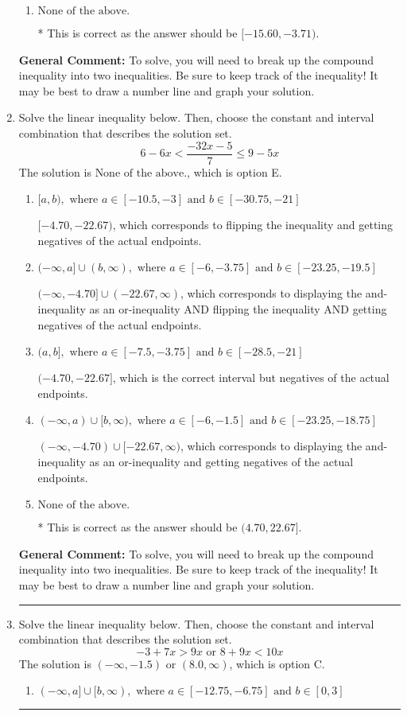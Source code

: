 \documentclass{extbook}[14pt]
\newcommand{\litem}[1]{\item #1

\rule{\textwidth}{0.4pt}}
\begin{document}
\begin{enumerate}
{\begin{enumerate}[label=\Alph*.]
$(-\infty, 15.60) \cup [3.71, \infty)$, which corresponds to displaying the and-inequality as an or-inequality AND flipping the inequality AND getting negatives of the actual endpoints.
\item \( \text{None of the above.} \)

* This is correct as the answer should be $[-15.60, -3.71)$.
\end{enumerate}

\textbf{General Comment:} To solve, you will need to break up the compound inequality into two inequalities. Be sure to keep track of the inequality! It may be best to draw a number line and graph your solution.
}
\litem{
Solve the linear inequality below. Then, choose the constant and interval combination that describes the solution set.
\[ 6 - 6 x < \frac{-32 x - 5}{7} \leq 9 - 5 x \]The solution is \( \text{None of the above.} \), which is option E.\begin{enumerate}[label=\Alph*.]
\item \( [a, b), \text{ where } a \in [-10.5, -3] \text{ and } b \in [-30.75, -21] \)

$[-4.70, -22.67)$, which corresponds to flipping the inequality and getting negatives of the actual endpoints.
\item \( (-\infty, a] \cup (b, \infty), \text{ where } a \in [-6, -3.75] \text{ and } b \in [-23.25, -19.5] \)

$(-\infty, -4.70] \cup (-22.67, \infty)$, which corresponds to displaying the and-inequality as an or-inequality AND flipping the inequality AND getting negatives of the actual endpoints.
\item \( (a, b], \text{ where } a \in [-7.5, -3.75] \text{ and } b \in [-28.5, -21] \)

$(-4.70, -22.67]$, which is the correct interval but negatives of the actual endpoints.
\item \( (-\infty, a) \cup [b, \infty), \text{ where } a \in [-6, -1.5] \text{ and } b \in [-23.25, -18.75] \)

$(-\infty, -4.70) \cup [-22.67, \infty)$, which corresponds to displaying the and-inequality as an or-inequality and getting negatives of the actual endpoints.
\item \( \text{None of the above.} \)

* This is correct as the answer should be $(4.70, 22.67]$.
\end{enumerate}

\textbf{General Comment:} To solve, you will need to break up the compound inequality into two inequalities. Be sure to keep track of the inequality! It may be best to draw a number line and graph your solution.
}
\litem{
Solve the linear inequality below. Then, choose the constant and interval combination that describes the solution set.
\[ -3 + 7 x > 9 x \text{ or } 8 + 9 x < 10 x \]The solution is \( (-\infty, -1.5) \text{ or } (8.0, \infty) \), which is option C.\begin{enumerate}[label=\Alph*.]
\item \( (-\infty, a] \cup [b, \infty), \text{ where } a \in [-12.75, -6.75] \text{ and } b \in [0, 3] \)


\end{enumerate}}
\end{enumerate}
\end{document}
